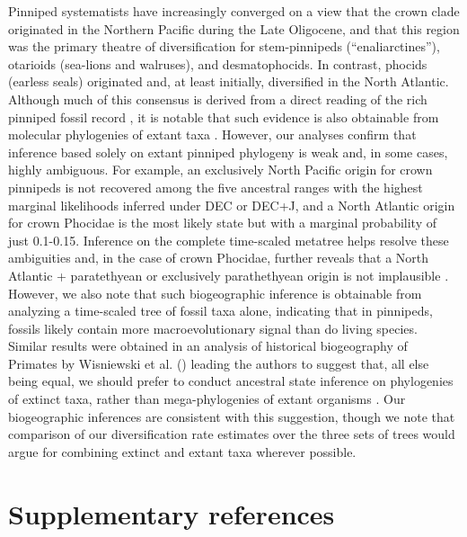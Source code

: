 \documentclass[a4paper, 12pt]{article}
\begin{document}
Pinniped systematists have increasingly converged on a view that the crown clade originated in the Northern Pacific during the Late Oligocene, and that this region was the primary theatre of diversification for stem-pinnipeds (“enaliarctines”), otarioids (sea-lions and walruses), and desmatophocids. In contrast, phocids (earless seals) originated and, at least initially, diversified in the North Atlantic. Although much of this consensus is derived from a direct reading of the rich pinniped fossil record \citep{repenning1979historical,demere2003chapter}, it is notable that such evidence is also obtainable from molecular phylogenies of extant taxa \citep{fyler2005historical,fulton2010multiple2,churchill2014colonization}. However, our analyses confirm that inference based solely on extant pinniped phylogeny is weak and, in some cases, highly ambiguous. For example, an exclusively North Pacific origin for crown pinnipeds is not recovered among the five ancestral ranges with the highest marginal likelihoods inferred under DEC or DEC+J, and a North Atlantic origin for crown Phocidae is the most likely state but with a marginal probability of just 0.1-0.15. Inference on the complete time-scaled metatree helps resolve these ambiguities and, in the case of crown Phocidae, further reveals that a North Atlantic + paratethyean or exclusively parathethyean origin is not implausible \citep[see also][]{rule2020first}. However, we also note that such biogeographic inference is obtainable from analyzing a time-scaled tree of fossil taxa alone, indicating that in pinnipeds, fossils likely contain more macroevolutionary signal than do living species. Similar results were obtained in an analysis of historical biogeography of Primates by Wisniewski et al. (\citeyear{wisniewski2022extant}) leading the authors to suggest that, all else being equal, we should prefer to conduct ancestral state inference on phylogenies of extinct taxa, rather than mega-phylogenies of extant organisms \citep[see][for a statistical justification]{ane2008analysis}. Our biogeographic inferences are consistent with this suggestion, though we note that comparison of our diversification rate estimates over the three sets of trees would argue for combining extinct and extant taxa wherever possible. 

\newpage
\section{Supplementary references}
 


\end{document}
